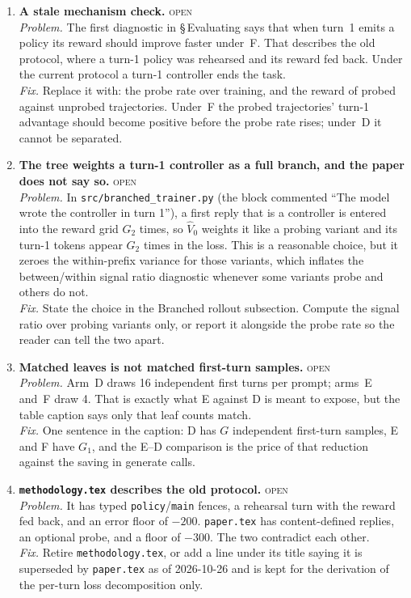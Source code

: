 \documentclass[11pt,a4paper]{article}
\newcommand{\status}[1]{\hfill{\small\textsc{#1}}}
\begin{document}
\begin{enumerate}[leftmargin=1.8em, itemsep=0.8em, resume]

\item \textbf{A stale mechanism check.} \status{open}
\label{it:mechanism}
\\
\emph{Problem.} The first diagnostic in \S\,Evaluating says that when
turn~1 emits a policy its reward should improve faster under~F. That
describes the old protocol, where a turn-1 policy was rehearsed and its
reward fed back. Under the current protocol a turn-1 controller ends the
task.
\\
\emph{Fix.} Replace it with: the probe rate over training, and the reward
of probed against unprobed trajectories. Under~F the probed trajectories'
turn-1 advantage should become positive before the probe rate rises;
under~D it cannot be separated.

\item \textbf{The tree weights a turn-1 controller as a full branch, and the
paper does not say so.} \status{open}
\label{it:replicate}
\\
\emph{Problem.} In \texttt{src/branched\_trainer.py} (the block commented
``The model wrote the controller in turn 1''), a first reply that is a
controller is entered into the reward grid $G_2$ times, so $\widehat V_0$
weights it like a probing variant and its turn-1 tokens appear $G_2$ times
in the loss. This is a reasonable choice, but it zeroes the within-prefix
variance for those variants, which inflates the between/within signal
ratio diagnostic whenever some variants probe and others do not.
\\
\emph{Fix.} State the choice in the Branched rollout subsection. Compute
the signal ratio over probing variants only, or report it alongside the
probe rate so the reader can tell the two apart.

\item \textbf{Matched leaves is not matched first-turn samples.}
\status{open}
\label{it:matched}
\\
\emph{Problem.} Arm~D draws 16 independent first turns per prompt; arms~E
and~F draw 4. That is exactly what E against D is meant to expose, but the
table caption says only that leaf counts match.
\\
\emph{Fix.} One sentence in the caption: D has $G$ independent first-turn
samples, E and F have $G_1$, and the E--D comparison is the price of that
reduction against the saving in generate calls.

\item \textbf{\texttt{methodology.tex} describes the old protocol.}
\status{open}
\label{it:methodology}
\\
\emph{Problem.} It has typed \texttt{policy}/\texttt{main} fences, a
rehearsal turn with the reward fed back, and an error floor of $-200$.
\texttt{paper.tex} has content-defined replies, an optional probe, and a
floor of $-300$. The two contradict each other.
\\
\emph{Fix.} Retire \texttt{methodology.tex}, or add a line under its title
saying it is superseded by \texttt{paper.tex} as of 2026-10-26 and is kept
for the derivation of the per-turn loss decomposition only.


\end{enumerate}
\end{document}
